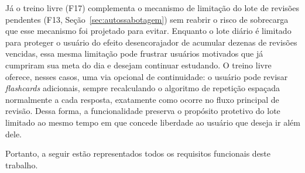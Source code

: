 Já o treino livre (F17) complementa o mecanismo de limitação do lote de revisões pendentes (F13, Seção~\ref{sec:autossabotagem}) sem reabrir o risco de sobrecarga que esse mecanismo foi projetado para evitar.
Enquanto o lote diário é limitado para proteger o usuário do efeito desencorajador de acumular dezenas de revisões vencidas, essa mesma limitação pode frustrar usuários motivados que já cumpriram sua meta do dia e desejam continuar estudando.
O treino livre oferece, nesses casos, uma via opcional de continuidade: o usuário pode revisar \textit{flashcards} adicionais, sempre recalculando o algoritmo de repetição espaçada normalmente a cada resposta, exatamente como ocorre no fluxo principal de revisão.
Dessa forma, a funcionalidade preserva o propósito protetivo do lote limitado ao mesmo tempo em que concede liberdade ao usuário que deseja ir além dele.

Portanto, a seguir estão representados todos os requisitos funcionais deste trabalho.

